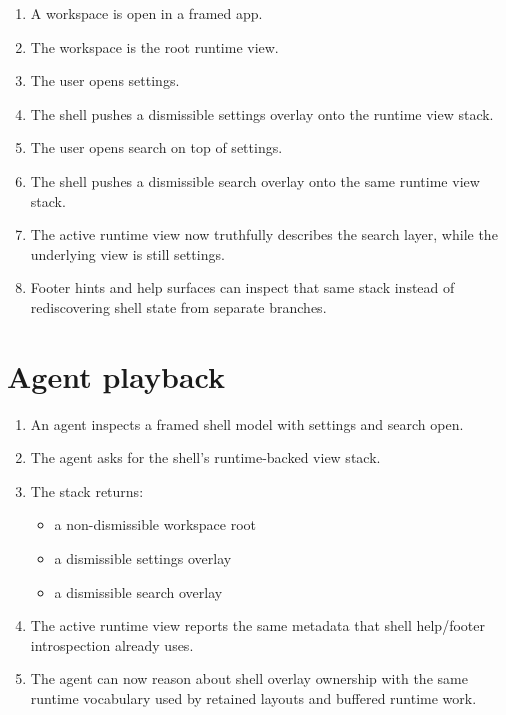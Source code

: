 \begin{enumerate}
\def\labelenumi{\arabic{enumi}.}
\tightlist
\item
  A workspace is open in a framed app.
\item
  The workspace is the root runtime view.
\item
  The user opens settings.
\item
  The shell pushes a dismissible settings overlay onto the runtime view stack.
\item
  The user opens search on top of settings.
\item
  The shell pushes a dismissible search overlay onto the same runtime view stack.
\item
  The active runtime view now truthfully describes the search layer, while the underlying view is still settings.
\item
  Footer hints and help surfaces can inspect that same stack instead of rediscovering shell state from separate branches.
\end{enumerate}

\section{Agent playback}\label{record-155-agent-playback}

\begin{enumerate}
\def\labelenumi{\arabic{enumi}.}
\tightlist
\item
  An agent inspects a framed shell model with settings and search open.
\item
  The agent asks for the shell's runtime-backed view stack.
\item
  The stack returns:

  \begin{itemize}
  \tightlist
  \item
    a non-dismissible workspace root
  \item
    a dismissible settings overlay
  \item
    a dismissible search overlay
  \end{itemize}
\item
  The active runtime view reports the same metadata that shell help/footer introspection already uses.
\item
  The agent can now reason about shell overlay ownership with the same runtime vocabulary used by retained layouts and buffered runtime work.
\end{enumerate}

